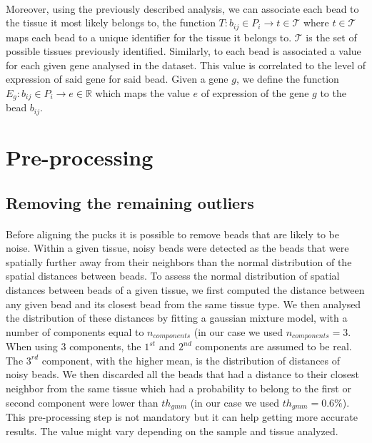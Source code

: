 \documentclass[10pt,a4paper]{article}
\begin{document}
\paragraph{}Moreover, using the previously described analysis, we can associate each bead to the tissue it most likely belongs to, the function \(T:b_{ij}\in P_i\rightarrow t\in\mathcal{T}\) where \(t\in\mathcal{T}\) maps each bead to a unique identifier for the tissue it belongs to. \(\mathcal{T}\) is the set of possible tissues previously identified.
Similarly, to each bead is associated a value for each given gene analysed in the dataset.
This value is correlated to the level of expression of said gene for said bead.
Given a gene \(g\), we define the function \(E_g:b_{ij}\in P_i\rightarrow e\in\mathbb{R}\) which maps the value \(e\) of expression of the gene \(g\) to the bead \(b_{ij}\).
\section{Pre-processing}
\subsection{Removing the remaining outliers}
\paragraph{}Before aligning the pucks it is possible to remove beads that are likely to be noise.
Within a given tissue, noisy beads were detected as the beads that were spatially further away from their neighbors than the normal distribution of the spatial distances between beads.
To assess the normal distribution of spatial distances between beads of a given tissue, we first computed the distance between any given bead and its closest bead from the same tissue type.
We then analysed the distribution of these distances by fitting a gaussian mixture model, with a number of components equal to \(n_{components}\) (in our case we used \(n_{components}=3\).
When using 3 components, the \(1^{st}\) and \(2^{nd}\) components are assumed to be real.
The \(3^{rd}\) component, with the higher mean, is the distribution of distances of noisy beads.
We then discarded all the beads that had a distance to their closest neighbor from the same tissue which had a probability to belong to the first or second component were lower than \(th_{gmm}\) (in our case we used \(th_{gmm}=0.6\%\)).
This pre-processing step is not mandatory but it can help getting more accurate results. The value might vary depending on the sample and tissue analyzed.
\end{document}
